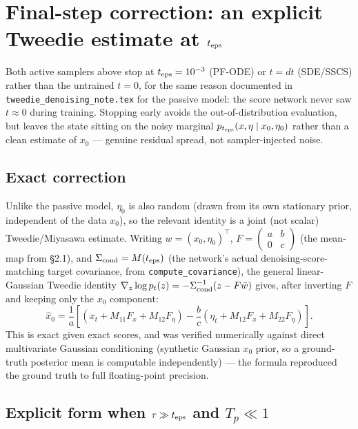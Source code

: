 \documentclass[11pt]{article}
\begin{document}
\section{Final-step correction: an explicit Tweedie estimate at $t_{\rm eps}$}

Both active samplers above stop at $t_{\rm eps}=10^{-3}$ (PF-ODE) or $t=dt$
(SDE/SSCS) rather than the untrained $t=0$, for the same reason documented in
\texttt{tweedie\_denoising\_note.tex} for the passive model: the score network
never saw $t\approx0$ during training. Stopping early avoids the
out-of-distribution evaluation, but leaves the state sitting on the noisy
marginal $p_{t_{\rm eps}}(x,\eta\mid x_0,\eta_0)$ rather than a clean estimate
of $x_0$ — genuine residual spread, not sampler-injected noise.

\subsection{Exact correction}

Unlike the passive model, $\eta_0$ is also random (drawn from its own
stationary prior, independent of the data $x_0$), so the relevant identity is
a joint (not scalar) Tweedie/Miyasawa estimate. Writing $w=(x_0,\eta_0)^\top$,
$F=\begin{pmatrix}a&b\\0&c\end{pmatrix}$ (the mean-map from \S2.1), and
$\Sigma_{\rm cond}=M(t_{\rm eps})$ (the network's actual denoising-score-matching
target covariance, from \texttt{compute\_covariance}), the general linear-Gaussian
Tweedie identity $\nabla_z\log p_t(z) = -\Sigma_{\rm cond}^{-1}(z-F\bar w)$ gives,
after inverting $F$ and keeping only the $x_0$ component:
\begin{equation}
\hat x_0 = \frac{1}{a}\left[(x_t + M_{11}F_x + M_{12}F_\eta)
- \frac{b}{c}\left(\eta_t + M_{12}F_x + M_{22}F_\eta\right)\right].
\label{eq:tweedie-active-exact}
\end{equation}
This is exact given exact scores, and was verified numerically against direct
multivariate Gaussian conditioning (synthetic Gaussian $x_0$ prior, so a
ground-truth posterior mean is computable independently) — the formula
reproduced the ground truth to full floating-point precision.

\subsection{Explicit form when $\tau \gg t_{\rm eps}$ and $T_p \ll 1$}
\end{document}
